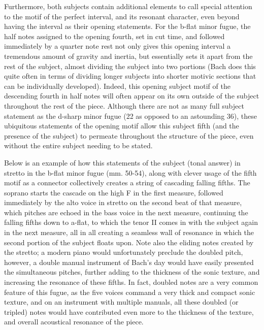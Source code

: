 Furthermore, both subjects contain additional elements to call special
attention to the motif of the perfect interval, and its resonant
character, even beyond having the interval as their opening statements.
For the b-flat minor fugue, the half notes assigned to the opening
fourth, set in cut time, and followed immediately by a quarter note rest
not only gives this opening interval a tremendous amount of gravity and
inertia, but essentially sets it apart from the rest of the subject,
almost dividing the subject into two portions (Bach does this quite
often in terms of dividing longer subjects into shorter motivic sections
that can be individually developed). Indeed, this opening subject motif
of the descending fourth in half notes will often appear on its own
outside of the subject throughout the rest of the piece. Although there
are not as many full subject statement as the d-sharp minor fugue (22 as
opposed to an astounding 36), these ubiquitous statements of the opening
motif allow this subject fifth (and the presence of the subject) to
permeate throughout the structure of the piece, even without the entire
subject needing to be stated.

Below is an example of how this statements of the subject (tonal answer)
in stretto in the b-flat minor fugue (mm. 50-54), along with clever
usage of the fifth motif as a connector collectively creates a string of
cascading falling fifths. The soprano starts the cascade on the high F
in the first measure, followed immediately by the alto voice in stretto
on the second beat of that measure, which pitches are echoed in the bass
voice in the next measure, continuing the falling fifths down to a-flat,
to which the tenor II comes in with the subject again in the next
measure, all in all creating a seamless wall of resonance in which the
second portion of the subject floats upon. Note also the eliding notes
created by the stretto; a modern piano would unfortunately preclude the
doubled pitch, however, a double manual instrument of Bach's day would
have easily presented the simultaneous pitches, further adding to the
thickness of the sonic texture, and increasing the resonance of these
fifths. In fact, doubled notes are a very common feature of this fugue,
as the five voices command a very thick and compact sonic texture, and
on an instrument with multiple manuals, all these doubled (or tripled)
notes would have contributed even more to the thickness of the texture,
and overall acoustical resonance of the piece.



